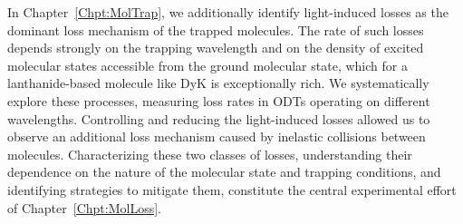 In Chapter~\ref{Chpt:MolTrap}, we additionally identify light-induced losses as the dominant loss mechanism of the trapped molecules. The rate of such losses depends strongly on the trapping wavelength and on the density of excited molecular states accessible from the ground molecular state, which for a lanthanide-based molecule like DyK is exceptionally rich. We systematically explore  these processes, measuring loss rates in \ac{ODT}s operating on different wavelengths. Controlling and reducing the light-induced losses allowed us to observe an additional loss mechanism caused by inelastic collisions between molecules. Characterizing these two classes of losses, understanding their dependence on the nature of the molecular state and trapping conditions, and identifying strategies to mitigate them, constitute the central experimental effort of Chapter~\ref{Chpt:MolLoss}.
















